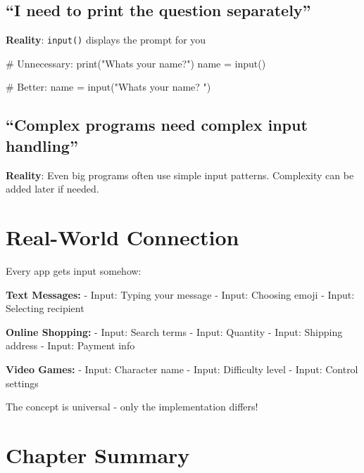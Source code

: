 \documentclass[
  letterpaper,
  DIV=11,
  numbers=noendperiod,
  oneside]{scrreprt}
\newenvironment{Shaded}{}{}
\newcommand{\BuiltInTok}[1]{\textcolor[rgb]{0.84,0.23,0.29}{#1}}
\newcommand{\CommentTok}[1]{\textcolor[rgb]{0.42,0.45,0.49}{#1}}
\newcommand{\NormalTok}[1]{\textcolor[rgb]{0.14,0.16,0.18}{#1}}
\newcommand{\OperatorTok}[1]{\textcolor[rgb]{0.14,0.16,0.18}{#1}}
\newcommand{\StringTok}[1]{\textcolor[rgb]{0.01,0.18,0.38}{#1}}
\begin{document}
\subsection{``I need to print the question
separately''}\label{i-need-to-print-the-question-separately}

\textbf{Reality}: \texttt{input()} displays the prompt for you

\begin{Shaded}
\begin{Highlighting}[]
\CommentTok{\# Unnecessary:}
\BuiltInTok{print}\NormalTok{(}\StringTok{"What\textquotesingle{}s your name?"}\NormalTok{)}
\NormalTok{name }\OperatorTok{=} \BuiltInTok{input}\NormalTok{()}

\CommentTok{\# Better:}
\NormalTok{name }\OperatorTok{=} \BuiltInTok{input}\NormalTok{(}\StringTok{"What\textquotesingle{}s your name? "}\NormalTok{)}
\end{Highlighting}
\end{Shaded}

\subsection{``Complex programs need complex input
handling''}\label{complex-programs-need-complex-input-handling}

\textbf{Reality}: Even big programs often use simple input patterns.
Complexity can be added later if needed.

\section{Real-World Connection}\label{real-world-connection-2}

Every app gets input somehow:

\textbf{Text Messages:} - Input: Typing your message - Input: Choosing
emoji - Input: Selecting recipient

\textbf{Online Shopping:} - Input: Search terms - Input: Quantity -
Input: Shipping address - Input: Payment info

\textbf{Video Games:} - Input: Character name - Input: Difficulty level
- Input: Control settings

The concept is universal - only the implementation differs!

\section{Chapter Summary}\label{chapter-summary-3}
\end{document}
